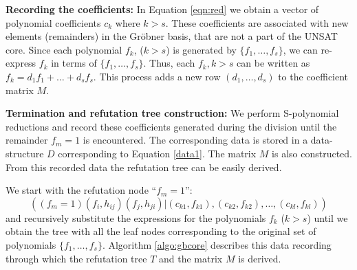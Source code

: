 {\bf Recording the coefficients:} In Equation \ref{eqn:red} we obtain a
vector of polynomial coefficients $c_k$ where $k>s$. These
coefficients are associated with new elements (remainders) in the
Gr\"obner basis, that are not a part of the UNSAT core. 
Since each polynomial $f_k$, ($k>s$) is generated by
$\{f_1,\dots,f_s\}$, we can re-express $f_k$ in terms of $\{f_1,\dots,
f_s\}$. Thus, each $f_k, k>s$ can be written as $f_k = d_1f_1 + \dots
+ d_sf_s$. This process adds a new row $(d_1,\dots,d_s)$ to the
coefficient matrix $M$. 



{\bf Termination and refutation tree construction:} We perform
S-polynomial reductions and record these coefficients  generated
during the division until the remainder $f_m = 1$ is encountered. The
corresponding data is stored in a data-structure $D$ corresponding to
Equation \ref{data1}. The matrix $M$ is also constructed. From this
recorded data the refutation tree can be easily derived. 

We start with the refutation node ``$f_m=1$'':
\begin{displaymath}
((f_{m}=1)(f_{i},h_{ij})(f_{j},h_{ji})| (c_{k1},f_{k1}),(c_{k2},f_{k2}),\dots,(c_{kl},f_{kl}))
\end{displaymath}
and recursively substitute the expressions for the polynomials $f_k$
($k>s$) until we obtain the tree with all the leaf nodes corresponding
to the original set of polynomials $\{f_1,\dots,f_s\}$. Algorithm
\ref{algo:gbcore} describes this data recording through which the
refutation tree $T$ and the matrix $M$ is derived. 

